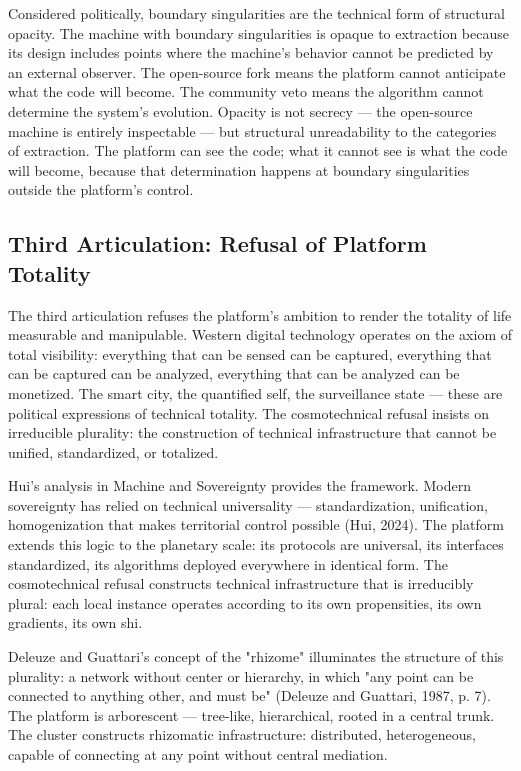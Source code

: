 Considered politically, boundary singularities are the technical form of structural opacity. The machine with boundary singularities is opaque to extraction because its design includes points where the machine's behavior cannot be predicted by an external observer. The open-source fork means the platform cannot anticipate what the code will become. The community veto means the algorithm cannot determine the system's evolution. Opacity is not secrecy — the open-source machine is entirely inspectable — but structural unreadability to the categories of extraction. The platform can see the code; what it cannot see is what the code will become, because that determination happens at boundary singularities outside the platform's control.

\subsection{Third Articulation: Refusal of Platform Totality}

The third articulation refuses the platform's ambition to render the totality of life measurable and manipulable. Western digital technology operates on the axiom of total visibility: everything that can be sensed can be captured, everything that can be captured can be analyzed, everything that can be analyzed can be monetized. The smart city, the quantified self, the surveillance state — these are political expressions of technical totality. The cosmotechnical refusal insists on irreducible plurality: the construction of technical infrastructure that cannot be unified, standardized, or totalized.

Hui's analysis in Machine and Sovereignty provides the framework. Modern sovereignty has relied on technical universality — standardization, unification, homogenization that makes territorial control possible (Hui, 2024). The platform extends this logic to the planetary scale: its protocols are universal, its interfaces standardized, its algorithms deployed everywhere in identical form. The cosmotechnical refusal constructs technical infrastructure that is irreducibly plural: each local instance operates according to its own propensities, its own gradients, its own shi.

Deleuze and Guattari's concept of the "rhizome" illuminates the structure of this plurality: a network without center or hierarchy, in which "any point can be connected to anything other, and must be" (Deleuze and Guattari, 1987, p. 7). The platform is arborescent — tree-like, hierarchical, rooted in a central trunk. The  cluster constructs rhizomatic infrastructure: distributed, heterogeneous, capable of connecting at any point without central mediation.

